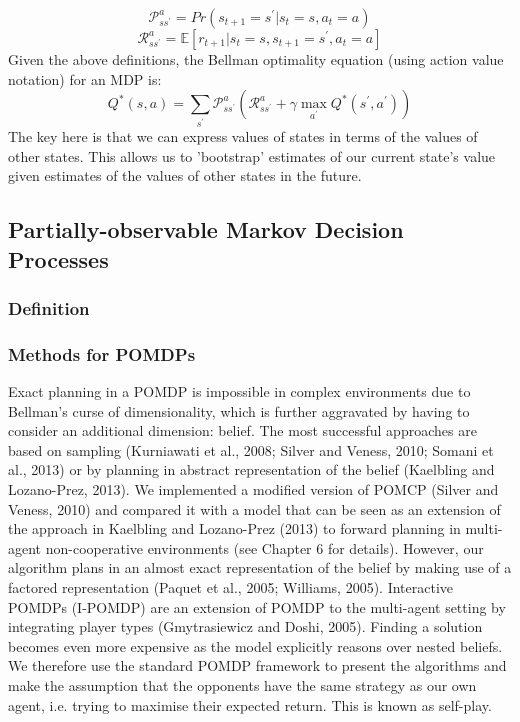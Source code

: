\documentclass[a4paper,12pt]{proposal}
\begin{document}
\begin{equation}
\mathcal{P}_{s{s^\prime}}^a = Pr(s_{t+1} = {s^\prime} | s_t = s, a_t = a)
\end{equation}
\begin{equation}
\mathcal{R}_{s{s^\prime}}^a = \mathbb{E}[r_{t+1} | s_t = s, s_{t+1} = {s^\prime}, a_t = a]
\end{equation}
Given the above definitions, the Bellman optimality equation (using action value notation) for an MDP is:
\begin{equation}
Q^*(s,a) = \sum_{s^\prime} \mathcal{P}_{s{s^\prime}}^a (\mathcal{R}_{s{s^\prime}}^a + \gamma \max_{a^\prime} Q^*({s^\prime}, {a^\prime}))
\end{equation}
The key here is that we can express values of states in terms of the values of other states. This allows us to 'bootstrap' estimates of our current state's value given estimates of the values of other states in the future. 

\subsection{Partially-observable Markov Decision Processes}
\subsubsection{Definition}


\subsubsection{Methods for POMDPs}
Exact planning in a POMDP is impossible in complex environments due to Bellman’s curse of dimensionality, which is further aggravated by having to consider an additional dimension: belief. The most successful approaches are based on sampling (Kurniawati et al., 2008; Silver and Veness, 2010; Somani et al., 2013) or by planning in abstract representation of the belief (Kaelbling and Lozano-Prez, 2013). We implemented a modified version of POMCP (Silver and Veness, 2010) and compared it with a model that can be seen as an extension of the approach in Kaelbling and Lozano-Prez (2013) to forward planning in multi-agent non-cooperative environments (see Chapter 6 for details). However, our algorithm plans in an almost exact representation of the belief by making use of a factored representation (Paquet et al., 2005; Williams, 2005). Interactive POMDPs (I-POMDP) are an extension of POMDP to the multi-agent setting by integrating player types (Gmytrasiewicz and Doshi, 2005). Finding a solution becomes even more expensive as the model explicitly reasons over nested beliefs. We therefore use the standard POMDP framework to present the algorithms and make the assumption that the opponents have the same strategy as our own agent, i.e. trying to maximise their expected return. This is known as self-play.
\end{document}
